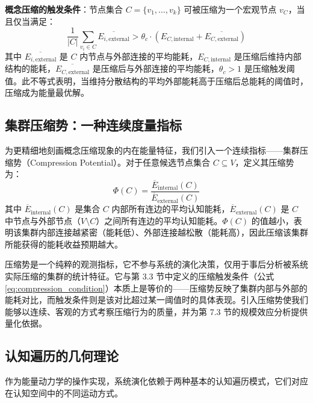 \documentclass[12pt,a4paper]{article}
\begin{document}
\textbf{概念压缩的触发条件}：节点集合 $C = \{v_1, \ldots, v_k\}$ 可被压缩为一个宏观节点 $v_C$，当且仅当满足：
\begin{equation}
\frac{1}{|C|}\sum_{v_i \in C} \overline{E_{i, \text{external}}} > \theta_c \cdot (E_{C, \text{internal}} + \overline{E_{C, \text{external}}})
\label{eq:compression_condition}
\end{equation}
其中 $\overline{E_{i, \text{external}}}$ 是 $C$ 内节点与外部连接的平均能耗，$E_{C, \text{internal}}$ 是压缩后维持内部结构的能耗，$\overline{E_{C, \text{external}}}$ 是压缩后与外部连接的平均能耗，$\theta_c > 1$ 是压缩触发阈值。此不等式表明，当维持分散结构的平均外部能耗高于压缩后总能耗的阈值时，压缩成为能量最优解。

\subsection{集群压缩势：一种连续度量指标}
\label{subsec:compression_potential}

为更精细地刻画概念压缩现象的内在能量特征，我们引入一个连续指标——集群压缩势（Compression Potential）。对于任意候选节点集合 $C \subseteq V$，定义其压缩势为：
\begin{equation}
\Phi(C) = \frac{\overline{E}_{\text{internal}}(C)}{\overline{E}_{\text{external}}(C)}
\label{eq:compression_potential}
\end{equation}
其中 $\overline{E}_{\text{internal}}(C)$ 是集合 $C$ 内部所有连边的平均认知能耗，$\overline{E}_{\text{external}}(C)$ 是 $C$ 中节点与外部节点（$V \setminus C$）之间所有连边的平均认知能耗。$\Phi(C)$ 的值越小，表明该集群内部连接越紧密（能耗低）、外部连接越松散（能耗高），因此压缩该集群所能获得的能耗收益预期越大。

压缩势是一个纯粹的观测指标，它不参与系统的演化决策，仅用于事后分析被系统实际压缩的集群的统计特征。它与第 3.3 节中定义的压缩触发条件（公式 \ref{eq:compression_condition}）本质上是等价的——压缩势反映了集群内部与外部的能耗对比，而触发条件则是该对比超过某一阈值时的具体表现。引入压缩势使我们能够以连续、客观的方式考察压缩行为的质量，并为第 7.3 节的规模效应分析提供量化依据。

\subsection{认知遍历的几何理论}

作为能量动力学的操作实现，系统演化依赖于两种基本的认知遍历模式，它们对应在认知空间中的不同运动方式。
\end{document}
